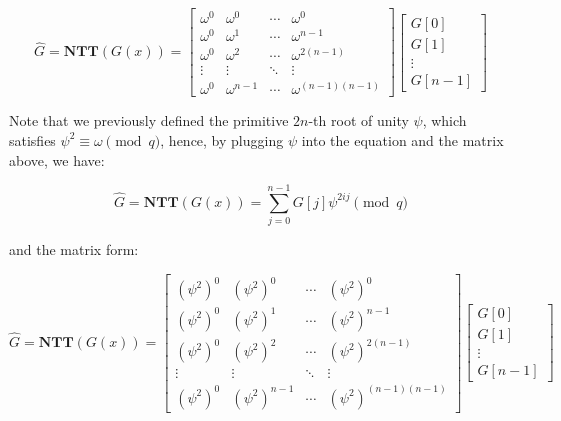 \documentclass[12pt]{article}
\begin{document}
\begin{equation*}
    \hat{G} 
    = \mathbf{NTT}(G(x)) 
    = \begin{bmatrix}
        \omega^0 & \omega^0 & \cdots & \omega^0 \\
        \omega^0 & \omega^1 & \cdots & \omega^{n-1} \\
        \omega^0 & \omega^2 & \cdots & \omega^{2(n-1)} \\
        \vdots & \vdots & \ddots & \vdots \\
        \omega^0 & \omega^{n-1} & \cdots & \omega^{(n-1)(n-1)}
    \end{bmatrix}
    \begin{bmatrix}
        G[0] \\
        G[1] \\
        \vdots \\
        G[n-1]
    \end{bmatrix}
\end{equation*}

Note that we previously defined the primitive $2n$-th root of unity $\psi$, 
which satisfies $\psi^2 \equiv \omega \pmod{q}$, hence, 
by plugging $\psi$ into the equation and the matrix above, 
we have:

\begin{equation*}
    \hat{G} = \mathbf{NTT}(G(x)) = \sum_{j = 0}^{n - 1} G[j] \psi^{2 i j} \pmod{q}
\end{equation*}

and the matrix form:

\begin{equation*}
    \hat{G} 
    = \mathbf{NTT}(G(x)) 
    = \begin{bmatrix}
        (\psi^2)^0 & (\psi^2)^0 & \cdots & (\psi^2)^0 \\
        (\psi^2)^0 & (\psi^2)^1 & \cdots & (\psi^2)^{n-1} \\
        (\psi^2)^0 & (\psi^2)^2 & \cdots & (\psi^2)^{2(n-1)} \\
        \vdots & \vdots & \ddots & \vdots \\
        (\psi^2)^0 & (\psi^2)^{n-1} & \cdots & (\psi^2)^{(n-1)(n-1)}
    \end{bmatrix}
    \begin{bmatrix}
        G[0] \\
        G[1] \\
        \vdots \\
        G[n-1]
    \end{bmatrix}
\end{equation*}
\end{document}
